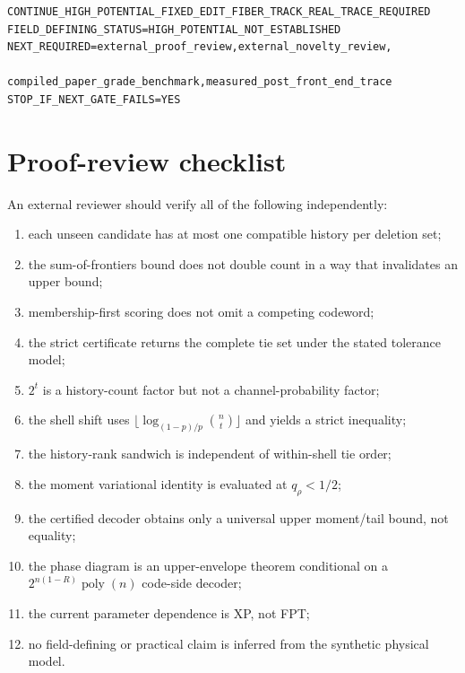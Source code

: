 \documentclass[11pt]{article}
\theoremstyle{definition}
\theoremstyle{remark}
\newcommand{\poly}{\operatorname{poly}}
\begin{document}
\begin{tcolorbox}[colback=green!4,colframe=green!45!black,title=Reference investment command]
\begin{verbatim}
CONTINUE_HIGH_POTENTIAL_FIXED_EDIT_FIBER_TRACK_REAL_TRACE_REQUIRED
FIELD_DEFINING_STATUS=HIGH_POTENTIAL_NOT_ESTABLISHED
NEXT_REQUIRED=external_proof_review,external_novelty_review,
              compiled_paper_grade_benchmark,measured_post_front_end_trace
STOP_IF_NEXT_GATE_FAILS=YES
\end{verbatim}
\end{tcolorbox}

\appendix
\section{Proof-review checklist}
An external reviewer should verify all of the following independently:
\begin{enumerate}[leftmargin=2em]
\item each unseen candidate has at most one compatible history per deletion set;
\item the sum-of-frontiers bound does not double count in a way that invalidates an upper bound;
\item membership-first scoring does not omit a competing codeword;
\item the strict certificate returns the complete tie set under the stated tolerance model;
\item $2^t$ is a history-count factor but not a channel-probability factor;
\item the shell shift uses $\lfloor\log_{(1-p)/p}\binom nt\rfloor$ and yields a strict inequality;
\item the history-rank sandwich is independent of within-shell tie order;
\item the moment variational identity is evaluated at $q_\rho<1/2$;
\item the certified decoder obtains only a universal upper moment/tail bound, not equality;
\item the phase diagram is an upper-envelope theorem conditional on a $2^{n(1-R)}\poly(n)$ code-side decoder;
\item the current parameter dependence is XP, not FPT;
\item no field-defining or practical claim is inferred from the synthetic physical model.
\end{enumerate}
\end{document}
